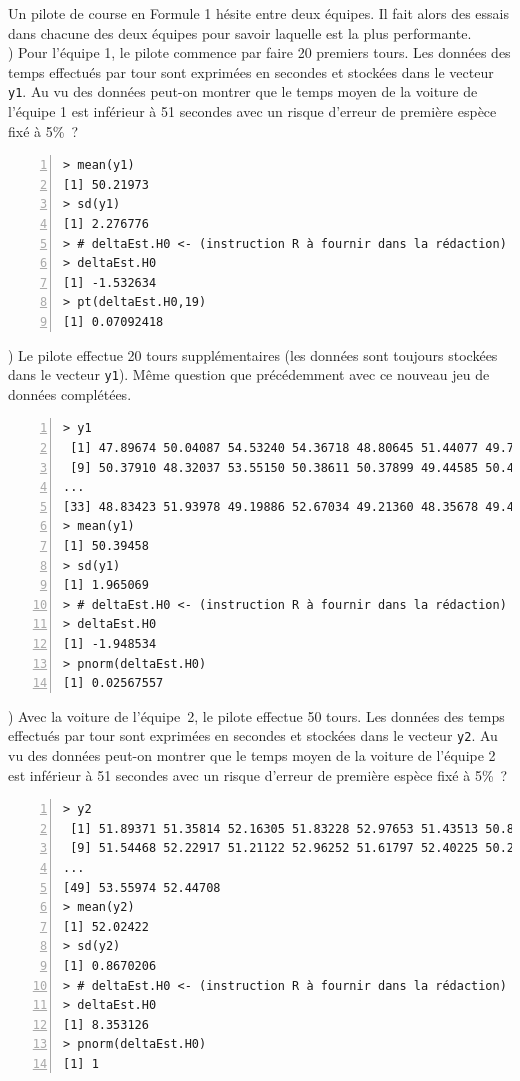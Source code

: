 \documentclass[10pt]{report}
\begin{document}
\begin{exercice}

Un pilote de course en Formule 1 hésite entre deux équipes. Il fait alors des essais dans chacune des deux équipes pour savoir laquelle est la plus performante.\\

) Pour l'équipe 1, le pilote commence par faire 20 premiers tours. Les données des temps effectués par tour sont exprimées en secondes et stockées dans le vecteur  \texttt{y1}. Au vu des données peut-on montrer que le temps moyen de la voiture de l'équipe 1 est inférieur à 51 secondes  avec un risque d'erreur de première espèce fixé à 5\%~?\\

\IndicR
\begin{Verbatim}[frame=leftline,fontfamily=tt,fontshape=n,numbers=left]
> mean(y1)
[1] 50.21973
> sd(y1)
[1] 2.276776
> # deltaEst.H0 <- (instruction R à fournir dans la rédaction)
> deltaEst.H0
[1] -1.532634
> pt(deltaEst.H0,19)
[1] 0.07092418
\end{Verbatim}




) Le pilote effectue 20 tours supplémentaires (les données sont toujours stockées dans le vecteur \texttt{y1}).
Même question que précédemment avec ce nouveau jeu de données complétées.\\
\IndicR
\begin{Verbatim}[frame=leftline,fontfamily=tt,fontshape=n,numbers=left]
> y1
 [1] 47.89674 50.04087 54.53240 54.36718 48.80645 51.44077 49.72669 44.81843
 [9] 50.37910 48.32037 53.55150 50.38611 50.37899 49.44585 50.47262 50.66881
...
[33] 48.83423 51.93978 49.19886 52.67034 49.21360 48.35678 49.43116 48.95199
> mean(y1)
[1] 50.39458
> sd(y1)
[1] 1.965069
> # deltaEst.H0 <- (instruction R à fournir dans la rédaction)
> deltaEst.H0
[1] -1.948534
> pnorm(deltaEst.H0)
[1] 0.02567557
\end{Verbatim}




) Avec la voiture de l'équipe~2,  le pilote effectue 50 tours. Les données des temps effectués par tour sont exprimées en secondes et stockées dans le vecteur  \texttt{y2}. Au vu des données peut-on montrer que le temps moyen de la voiture de l'équipe 2 est inférieur à 51 secondes  avec un risque d'erreur de première espèce fixé à 5\%~?\\

\IndicR
\begin{Verbatim}[frame=leftline,fontfamily=tt,fontshape=n,numbers=left]
> y2
 [1] 51.89371 51.35814 52.16305 51.83228 52.97653 51.43513 50.89370 51.50756
 [9] 51.54468 52.22917 51.21122 52.96252 51.61797 52.40225 50.21097 51.73468
...
[49] 53.55974 52.44708
> mean(y2)
[1] 52.02422
> sd(y2)
[1] 0.8670206
> # deltaEst.H0 <- (instruction R à fournir dans la rédaction)
> deltaEst.H0
[1] 8.353126
> pnorm(deltaEst.H0)
[1] 1
\end{Verbatim}





\end{exercice}
\end{document}
